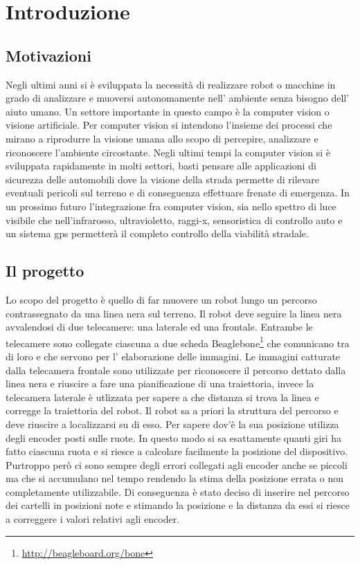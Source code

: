 \chapter{Introduzione}

\section{Motivazioni}

	Negli ultimi anni si è sviluppata la necessità di realizzare robot o macchine in grado di analizzare e muoversi autonomamente nell' ambiente senza bisogno dell' aiuto umano. Un settore importante in questo campo è la computer vision o visione artificiale. Per computer vision si intendono l’insieme dei processi che mirano a riprodurre la visione umana allo scopo di percepire, analizzare e riconoscere l'ambiente circostante. Negli ultimi tempi la computer vision si è sviluppata rapidamente in molti settori, basti pensare alle applicazioni di sicurezza delle automobili dove la visione della strada permette di rilevare eventuali pericoli sul terreno e di conseguenza effettuare frenate di emergenza. In un prossimo futuro l'integrazione fra computer vision, sia nello spettro di luce visibile che nell'infrarosso, ultravioletto, raggi-x, sensoristica di controllo auto e un sistema gps permetterà il completo controllo della viabilità stradale.

\section{Il progetto}

	Lo scopo del progetto è quello di far muovere un robot lungo un percorso contrassegnato da una linea nera sul terreno. Il robot deve seguire la linea nera avvalendosi di due telecamere: una laterale ed una frontale. Entrambe le telecamere sono collegate ciascuna a due scheda Beaglebone\footnote{\url{http://beagleboard.org/bone}} che comunicano tra di loro e che servono per l' elaborazione delle immagini. Le immagini catturate dalla telecamera frontale sono utilizzate per riconoscere il percorso dettato dalla linea nera e riuscire a fare una pianificazione di una traiettoria, invece la telecamera laterale è utlizzata per sapere a che distanza si trova la linea e corregge la traiettoria del robot. Il robot sa a priori la struttura del percorso e deve riuscire a localizzarsi su di esso. Per sapere dov'è la sua posizione utilizza degli encoder posti sulle ruote. In questo modo si sa esattamente quanti giri ha fatto ciascuna ruota e si riesce a calcolare facilmente la posizione del dispositivo. Purtroppo però ci sono sempre degli errori collegati agli encoder anche se piccoli ma che si accumulano nel tempo rendendo la stima della posizione errata o non completamente utilizzabile. Di conseguenza è stato deciso di inserire nel percorso dei cartelli in posizioni note e stimando la posizione e la distanza da essi si riesce a correggere i valori relativi agli encoder.

